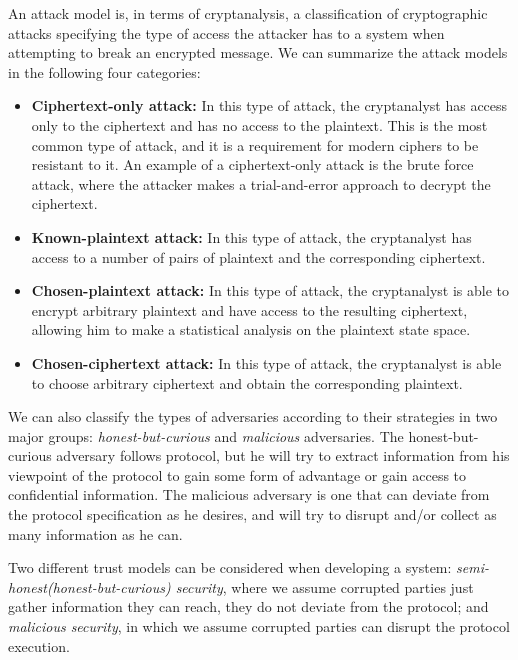 An attack model is, in terms of cryptanalysis, a classification of cryptographic attacks specifying the type of access the attacker has to a system when attempting to break an encrypted message. We can summarize the attack models in the following four categories:

 \begin{itemize}
    \setlength\itemsep{1em}

    \item \textbf{Ciphertext-only attack:} In this type of attack, the cryptanalyst has access only to the ciphertext and has no access to the plaintext. This is the most common type of attack, and it is a requirement for modern ciphers to be resistant to it. An example of a ciphertext-only attack is the brute force attack, where the attacker makes a trial-and-error approach to decrypt the ciphertext.

    \item \textbf{Known-plaintext attack:} In this type of attack, the cryptanalyst has access to a number of pairs of plaintext and the corresponding ciphertext.

    \item \textbf{Chosen-plaintext attack:} In this type of attack, the cryptanalyst is able to encrypt arbitrary plaintext and have access to the resulting ciphertext, allowing him to make a statistical analysis on the plaintext state space.

    \item \textbf{Chosen-ciphertext attack:} In this type of attack, the cryptanalyst is able to choose arbitrary ciphertext and obtain the corresponding plaintext.
\end{itemize}


We can also classify the types of adversaries according to their strategies in two major groups: \textit{honest-but-curious} and \textit{malicious} adversaries.
The honest-but-curious adversary follows protocol, but he will try to extract information from his viewpoint of the protocol to gain some form of advantage or gain access to confidential information.
The malicious adversary is one that can deviate from the protocol specification as he desires, and will try to disrupt and/or collect as many information as he can.

Two different trust models can be considered when developing a system: \textit{semi-honest(honest-but-curious) security}, where we assume corrupted parties just gather information they can reach, they do not deviate from the protocol; and \textit{malicious security}, in which we assume corrupted parties can disrupt the protocol execution.

